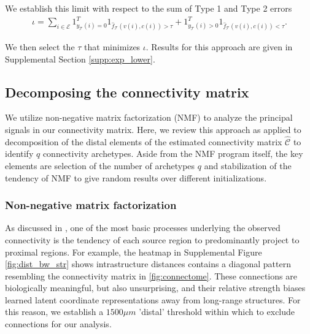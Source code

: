 We establish this limit with respect to the sum of Type 1 and Type 2 errors
\begin{eqnarray*}
\iota = \sum_{i \in \mathcal E} 1_{y_{\mathcal T}(i) = 0}^T 1_{\hat f_{\mathcal T}(v(i),c(i)) > \tau} + 1_{y_{\mathcal T}(i) > 0}^T 1_{\hat f_{\mathcal T}(v(i),c(i)) < \tau}  .
\end{eqnarray*}

We then select the $\tau$ that minimizes $\iota$.
Results for this approach are given in Supplemental Section \ref{supp:exp_lower}.

\newpage

\subsection{Decomposing the connectivity matrix}
\label{supp_sec:matrix_factor_methods}

We utilize non-negative matrix factorization (NMF) to analyze the principal signals in our connectivity matrix.
Here, we review this approach as applied to decomposition of the distal elements of the estimated connectivity matrix $\widehat {\mathcal C}$ to identify $q$ connectivity archetypes.
Aside from the NMF program itself, the key elements are selection of the number of archetypes $q$ and stabilization of the tendency of NMF to give random results over different initializations. 

\subsubsection{Non-negative matrix factorization}

As discussed in \citet{Knox2019-ot}, one of the most basic processes underlying the observed connectivity is the tendency of each source region to predominantly project to proximal regions.
For example, the heatmap in Supplemental Figure \ref{fig:dist_bw_str} shows intrastructure distances contains a diagonal pattern resembling  the connectivity matrix in \ref{fig:connectome}.
These connections are biologically meaningful, but also unsurprising, and their relative strength biases learned latent coordinate representations away from long-range structures.
For this reason, we establish a $1500 \mu m$ 'distal' threshold within which to exclude connections for our analysis.




